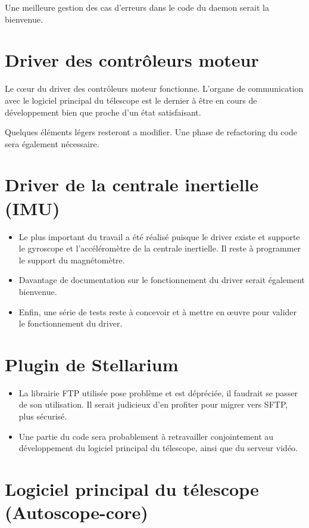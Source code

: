 Une meilleure gestion des cas d'erreurs dans le code du daemon serait la bienvenue.

\section{Driver des contrôleurs moteur}

Le cœur du driver des contrôleurs moteur fonctionne. L'organe de communication avec le logiciel principal du télescope est le dernier à être en cours de développement bien que proche d'un état satisfaisant.

Quelques éléments légers resteront a modifier. Une phase de refactoring du code sera également nécessaire.

\section{Driver de la centrale inertielle (IMU)}

\begin{itemize}[label=$\bullet$]
	\item Le plus important du travail a été réalisé puisque le driver existe et supporte le gyroscope et l'accéléromètre de la centrale inertielle. Il reste à programmer le support du magnétomètre.
	\item Davantage de documentation sur le fonctionnement du driver serait également bienvenue.
	\item Enfin, une série de tests reste à concevoir et à mettre en œuvre pour valider le fonctionnement du driver.
	\end{itemize}

\section{Plugin de Stellarium}

\begin{itemize}[label=$\bullet$]
	\item La librairie FTP utilisée  pose problème et est dépréciée, il faudrait se passer de son utilisation. Il serait judicieux d'en profiter pour migrer vers SFTP, plus sécurisé.
	\item Une partie du code sera probablement à retravailler conjointement au développement du logiciel principal du télescope, ainsi que du serveur vidéo.
	\end{itemize}

\section{Logiciel principal du télescope (Autoscope-core)}

